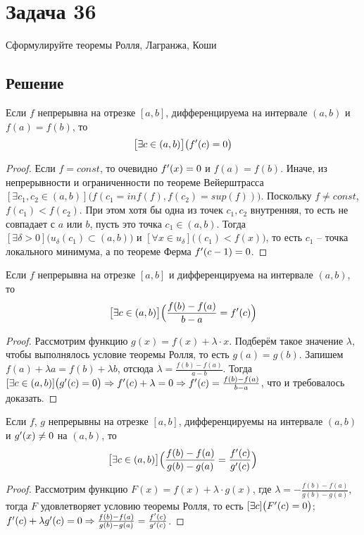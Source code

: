 \section*{Задача 36}
Сформулируйте теоремы Ролля, Лагранжа, Коши

\subsection*{Решение}
\begin{ther}
    Если $f$ непрерывна на отрезке $[a,b]$, дифференцируема на интервале
    $(a,b)$ и $f(a)=f(b)$, то
    $$\big[\exists c \in (a,b)\big]\big(f^{\prime}(c) = 0\big)$$
\end{ther}
\begin{proof}
    Если $f=const$, то очевидно $f^{\prime}(x)=0$ и $f(a)=f(b)$. Иначе, из
    непрерывности и ограниченности по теореме Вейерштрасса $[\exists c_1,
    c_2\in(a,b)]\big(f(c_1 = inf(f), f(c_2)=sup(f))\big)$. Поскольку $f\neq
    const$, $f(c_1)<f(c_2)$. При этом хотя бы одна из точек $c_1, c_2$
    внутренняя, то есть не совпадает с $a$ или $b$, пусть это точка
    $c_1\in(a,b)$. Тогда $[\exists
    \delta>0]\big(u_{\delta}(c_1)\subset(a,b)\big)$ и $[\forall x \in u_{\delta}
    ]\big((c_1) < f(x)\big)$, то есть $c_1$ -- точка локального минимума, а
    по теореме Ферма $f^{\prime}(c-1) = 0$.
\end{proof}


\begin{ther}
    Если $f$ непрерывна на отрезке $[a,b]$ и дифференцируема на интервале
    $(a,b)$, то $$\big[\exists c \in (a,b)\big]\Big(
    \frac{f(b)-f(a)}{b-a}=f^{\prime}(c) \Big)$$
\end{ther}
\begin{proof}
    Рассмотрим функцию $g(x) = f(x)+\lambda\cdot x$. Подберём такое
    значение $\lambda$, чтобы выполнялось условие теоремы Ролля, то есть
    $g(a)=g(b)$. Запишем $f(a) + \lambda a = f(b) + \lambda b$, отсюда
    $\lambda = \frac{f(b)-f(a)}{a-b}$. Тогда $[\exists c \in
    (a,b)]\big(g^{\prime}(c) = 0\big)\Rightarrow f^{\prime}(c) + \lambda = 0
    \Rightarrow f^{\prime}(c) = \frac{f(b)-f(a)}{b-a}$, что и требовалось
    доказать.
\end{proof}


\begin{ther}
    Если $f$, $g$ непрерывны на отрезке $[a,b]$, дифференцируемы на интервале
    $(a,b)$ и $g^{\prime}(x)\neq 0$ на $(a,b)$, то $$\big[\exists c \in
    (a,b)\big]\Big(
    \frac{f(b)-f(a)}{g(b)-g(a)}=\frac{f^{\prime}(c)}{g^{\prime}(c)} \Big)$$
\end{ther}
\begin{proof}
    Рассмотрим функцию $F(x) = f(x)+\lambda\cdot g(x)$, где
    $\lambda = -\frac{f(b)-f(a)}{g(b)-g(a)}$, тогда $F$ удовлетворяет
    условию теоремы Ролля, то есть $[\exists c]\big( F^{\prime}(c) = 0\big)$;
    $f^{\prime}(c)+\lambda g^{\prime}(c) = 0 \Rightarrow \frac{f(b)-f(a)}{g(b)-g(a)}
    = \frac{f^{\prime}(c)}{g^{\prime}(c)}$.
\end{proof}
